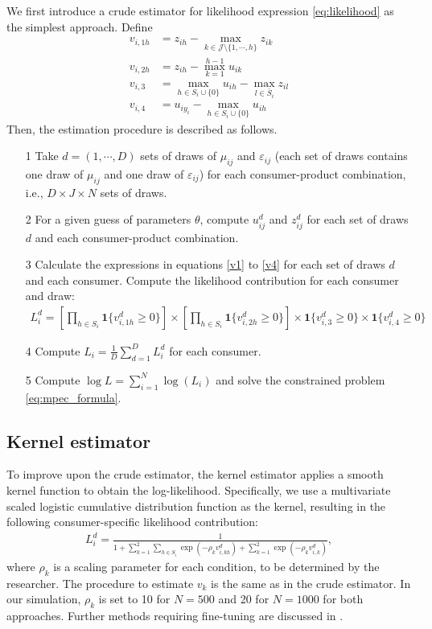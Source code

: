 \documentclass[12pt]{article}
\renewcommand*{\epsilon}{\varepsilon}
\begin{document}
We first introduce a crude estimator for likelihood expression \eqref{eq:likelihood} as the simplest approach.
Define
\begin{align}
    v_{i,1h} &= z_{ih} - \max_{k \in \mathcal{J}\setminus \{1,\cdots,h\}} z_{ik} \label{v1}\\
    v_{i,2h} &=  z_{ih} - \max_{k = 1}^{h-1} u_{ik} \label{v2} \\
    v_{i,3} &= \max_{h \in S_i \cup \{0\}} u_{ih} - \max_{l \in \bar{S}_i} z_{il} \label{v3}\\
    v_{i,4} &= u_{iy_i} - \max_{h \in S_i \cup \{0\}} u_{ih}  \label{v4}
\end{align}
Then, the estimation procedure is described as follows.
\begin{itemize}
    \item[1] Take $d = (1, \cdots, D)$ sets of draws of $\mu_{ij}$ and $\epsilon_{ij}$ (each set of draws contains one draw of $\mu_{ij}$ and one draw of $\epsilon_{ij}$) for each consumer-product combination, i.e., $D\times J \times N$ sets of draws.
    \item[2] For a given guess of parameters $\theta$, compute $u^d_{ij}$ and $z^d_{ij}$ for each set of draws $d$ and each consumer-product combination.
    \item[3] Calculate the expressions in equations \eqref{v1} to \eqref{v4} for each set of draws $d$ and each consumer. Compute the likelihood contribution for each consumer and draw:
    \begin{align*}
        L_i^d = \left[\prod_{h \in S_i} \bm{1}\{v^d_{i,1h} \geq 0\} \right] \times \left[\prod_{h \in S_i} \bm{1}\{v^d_{i,2h} \geq 0\} \right] \times  \bm{1}\{v^d_{i,3} \geq 0\}  \times  \bm{1}\{v^d_{i,4} \geq 0\}
    \end{align*}
    \item[4] Compute $L_i = \frac{1}{D}\sum_{d = 1}^D L_i^d$ for each consumer.
    \item[5] Compute $\log L = \sum_{i = 1}^N \log(L_i)$ and solve the constrained problem \eqref{eq:mpec_formula}.
\end{itemize}


\subsection{Kernel estimator}
To improve upon the crude estimator, the kernel estimator applies a smooth kernel function to obtain the log-likelihood. Specifically, we use a multivariate scaled logistic cumulative distribution function as the kernel, resulting in the following consumer-specific likelihood contribution:
\begin{align*}
    L_i^d = \frac{1}{1 + \sum_{k=1}^2 \sum_{h \in S_i} \exp (- \rho_k v^d_{i,kh}) + \sum_{k=1}^2 \exp (- \rho_k v^d_{i,k})},
\end{align*}
where \(\rho_k\) is a scaling parameter for each condition, to be determined by the researcher. The procedure to estimate \(v_k\) is the same as in the crude estimator. In our simulation, \(\rho_k\) is set to 10 for \(N=500\) and 20 for \(N=1000\) for both approaches. Further methods requiring fine-tuning are discussed in \cite{ursu2023sequential}.
\end{document}
